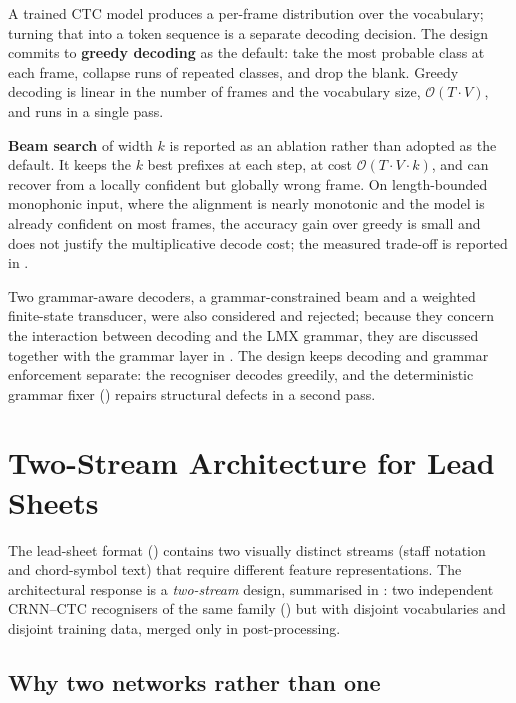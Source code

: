 A trained CTC model produces a per-frame distribution over the
vocabulary; turning that into a token sequence is a separate decoding
decision.
The design commits to \textbf{greedy decoding} as the default: take
the most probable class at each frame, collapse runs of repeated
classes, and drop the blank.
Greedy decoding is linear in the number of frames and the vocabulary
size, $\mathcal{O}(T\cdot V)$, and runs in a single pass.

\textbf{Beam search} of width $k$ is reported as an ablation rather
than adopted as the default.
It keeps the $k$ best prefixes at each step, at cost
$\mathcal{O}(T\cdot V\cdot k)$, and can recover from a locally
confident but globally wrong frame.
On length-bounded monophonic input, where the alignment is nearly
monotonic and the model is already confident on most frames, the
accuracy gain over greedy is small and does not justify the
multiplicative decode cost; the measured trade-off is reported in
.

Two grammar-aware decoders, a grammar-constrained beam and a
weighted finite-state transducer, were also considered and rejected;
because they concern the interaction between decoding and the LMX
grammar, they are discussed together with the grammar layer in
.
The design keeps decoding and grammar enforcement separate: the
recogniser decodes greedily, and the deterministic grammar fixer
() repairs structural defects in a second
pass.

\section{Two-Stream Architecture for Lead Sheets}
\label{sec:design-twostream}

The lead-sheet format () contains two visually
distinct streams (staff notation and chord-symbol text) that
require different feature representations.
The architectural response is a \textit{two-stream} design, summarised
in : two independent CRNN--CTC recognisers
of the same family () but with disjoint
vocabularies and disjoint training data, merged only in
post-processing.



\subsection{Why two networks rather than one}

